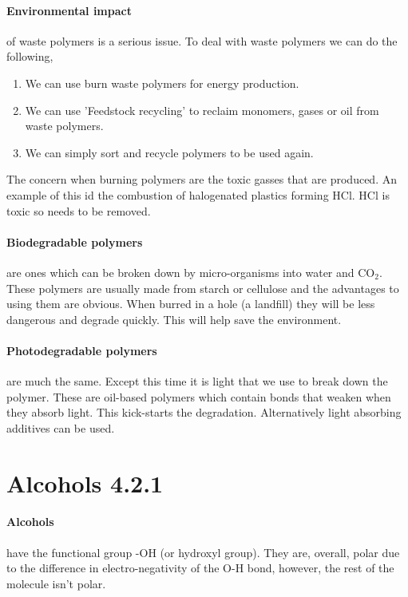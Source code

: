 	\begin{center}
	\end{center}
	
	\paragraph{Environmental impact} of waste polymers is a serious issue. To deal with waste polymers we can do the following,
	\begin{enumerate}
		\item We can use burn waste polymers for energy production.
		\item We can use 'Feedstock recycling' to reclaim monomers, gases or oil from waste polymers.
		\item We can simply sort and recycle polymers to be used again.
	\end{enumerate}
	The concern when burning polymers are the toxic gasses that are produced. An example of this id the combustion of halogenated plastics forming HCl. HCl is toxic so needs to be removed. %
	
	\paragraph{Biodegradable polymers} are ones which can be broken down by micro-organisms into water and CO$_2$. These polymers are usually made from starch or cellulose and the advantages to using them are obvious. When burred in a hole (a landfill) they will be less dangerous and degrade quickly. This will help save the environment.
	
	\paragraph{Photodegradable polymers} are much the same. Except this time it is light that we use to break down the polymer. These are oil-based polymers which contain bonds that weaken when they absorb light. This kick-starts the degradation. Alternatively light absorbing additives can be used.
	
\section{Alcohols 4.2.1}

	\paragraph{Alcohols} have the functional group -OH (or hydroxyl group). They are, overall, polar due to the difference in electro-negativity of the O-H bond, however, the rest of the molecule isn't polar.
	
